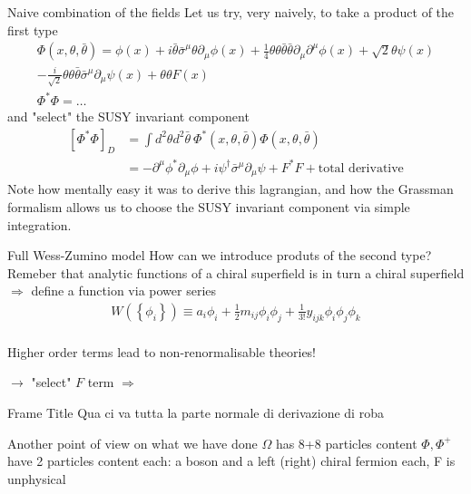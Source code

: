 \documentclass[10pt]{beamer}
\begin{document}
\begin{frame}{Naive combination of the fields}
Let us try, very naively, to take a product of the first type
\begin{gather*}
\Phi(x, \theta, \bar\theta) = \phi(x) + i\bar\theta \bar\sigma^{\mu}\theta \partial_{\mu}\phi(x) + \frac{1}{4}\theta\theta\bar\theta\bar\theta\partial_{\mu}\partial^{\mu}\phi(x) + \sqrt{2}\theta\psi(x)\\ 
-\frac{i}{\sqrt{2}}\theta\theta\bar\theta\bar\sigma^{\mu}\partial_{\mu}\psi(x) + \theta\theta F(x) \\
\Phi^*\Phi = \dots
\end{gather*}
and "select" the SUSY invariant component
\begin{align*}
    \left[\Phi^*\Phi\right]_D & = \int d^2\theta d^2\bar\theta \ \Phi^*(x, \theta, \bar\theta) \Phi(x, \theta, \bar\theta) \\
    & =  -\partial^{\mu}\phi^*\partial_{\mu}\phi + i\psi^{\dagger}\bar\sigma^{\mu}\partial_{\mu}\psi + F^*F + \text{total derivative}
\end{align*}
Note how mentally easy it was to derive this lagrangian, and how the Grassman formalism allows us to choose the SUSY invariant component via simple integration.
\end{frame}

\begin{frame}{Full Wess-Zumino model}
How can we introduce produts of the second type? \\
Remeber that analytic functions of a chiral superfield is in turn a chiral superfield $\Rightarrow$ define a function via power series
\begin{gather*}
    W(\left\{\phi_i\right\}) \equiv a_i\phi_i + \frac{1}{2} m_{ij} \phi_i\phi_j + \frac{1}{3!} y_{ijk} \phi_i\phi_j\phi_k \\
\end{gather*}
\centerline{Higher order terms lead to non-renormalisable theories!}
$\rightarrow$ "select" $F$ term $\Rightarrow$
\end{frame}

\begin{frame}{Frame Title}
Qua ci va tutta la parte normale di derivazione di roba
\end{frame}
    
\begin{frame}{Another point of view on what we have done}
$\Omega$ has 8+8 particles content
$\Phi, \Phi^+$ have 2 particles content each: a boson and a left (right) chiral fermion each, F is unphysical
\end{frame}
\end{document}
